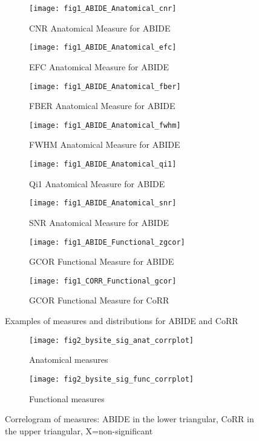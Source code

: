 \begin{figure}[!ht]
  \centering
     \begin{subfigure}[b]{0.9\textwidth}
       \texttt{[image: fig1\_ABIDE\_Anatomical\_cnr]}
       \caption{CNR Anatomical Measure for ABIDE}
     \end{subfigure}
     \begin{subfigure}[b]{0.9\textwidth}
       \texttt{[image: fig1\_ABIDE\_Anatomical\_efc]}
       \caption{EFC Anatomical Measure for ABIDE}
     \end{subfigure}
     \begin{subfigure}[b]{0.9\textwidth}
       \texttt{[image: fig1\_ABIDE\_Anatomical\_fber]}
       \caption{FBER Anatomical Measure for ABIDE}
     \end{subfigure}
     \begin{subfigure}[b]{0.9\textwidth}
       \texttt{[image: fig1\_ABIDE\_Anatomical\_fwhm]}
       \caption{FWHM Anatomical Measure for ABIDE}
     \end{subfigure}
     \begin{subfigure}[b]{0.9\textwidth}
       \texttt{[image: fig1\_ABIDE\_Anatomical\_qi1]}
       \caption{Qi1 Anatomical Measure for ABIDE}
     \end{subfigure}
     \begin{subfigure}[b]{0.9\textwidth}
       \texttt{[image: fig1\_ABIDE\_Anatomical\_snr]}
       \caption{SNR Anatomical Measure for ABIDE}
     \end{subfigure}
     \begin{subfigure}[b]{0.9\textwidth}
       \texttt{[image: fig1\_ABIDE\_Functional\_zgcor]}
       \caption{GCOR Functional Measure for ABIDE}
     \end{subfigure}
     \begin{subfigure}[b]{0.9\textwidth}
       \texttt{[image: fig1\_CORR\_Functional\_gcor]}
       \caption{GCOR Functional Measure for CoRR}
     \end{subfigure} 
     \caption{Examples of measures and distributions for ABIDE and CoRR}
\end{figure}

\begin{figure}[!ht]
  \centering
     \begin{subfigure}[b]{0.4\textwidth}
       \texttt{[image: fig2\_bysite\_sig\_anat\_corrplot]}
       \caption{Anatomical measures}
     \end{subfigure}
     \begin{subfigure}[b]{0.4\textwidth}
       \texttt{[image: fig2\_bysite\_sig\_func\_corrplot]}
       \caption{Functional measures}
     \end{subfigure} 
     \caption{Correlogram of measures: ABIDE in the lower triangular, CoRR in the upper triangular, X=non-significant}
\end{figure}

